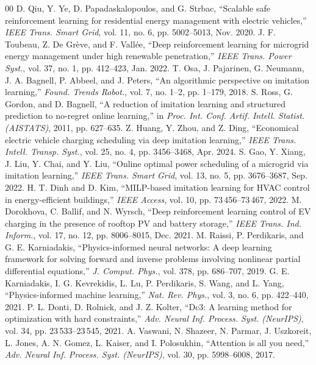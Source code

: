 \documentclass[journal]{IEEEtran}
\theoremstyle{remark}
\begin{document}
\begin{thebibliography}{00}
 D. Qiu, Y. Ye, D. Papadaskalopoulos, and G. Strbac, ``Scalable safe reinforcement learning for residential energy management with electric vehicles,'' \textit{IEEE Trans. Smart Grid}, vol. 11, no. 6, pp. 5002--5013, Nov. 2020.
 J. F. Toubeau, Z. De Gr\`{e}ve, and F. Vall\'{e}e, ``Deep reinforcement learning for microgrid energy management under high renewable penetration,'' \textit{IEEE Trans. Power Syst.}, vol. 37, no. 1, pp. 412--423, Jan. 2022.
 T. Osa, J. Pajarinen, G. Neumann, J. A. Bagnell, P. Abbeel, and J. Peters, ``An algorithmic perspective on imitation learning,'' \textit{Found. Trends Robot.}, vol. 7, no. 1--2, pp. 1--179, 2018.
 S. Ross, G. Gordon, and D. Bagnell, ``A reduction of imitation learning and structured prediction to no-regret online learning,'' in \textit{Proc. Int. Conf. Artif. Intell. Statist. (AISTATS)}, 2011, pp. 627--635.
 Z. Huang, Y. Zhou, and Z. Ding, ``Economical electric vehicle charging scheduling via deep imitation learning,'' \textit{IEEE Trans. Intell. Transp. Syst.}, vol. 25, no. 4, pp. 3456--3468, Apr. 2024.
 S. Gao, Y. Xiang, J. Liu, Y. Chai, and Y. Liu, ``Online optimal power scheduling of a microgrid via imitation learning,'' \textit{IEEE Trans. Smart Grid}, vol. 13, no. 5, pp. 3676--3687, Sep. 2022.
 H. T. Dinh and D. Kim, ``MILP-based imitation learning for HVAC control in energy-efficient buildings,'' \textit{IEEE Access}, vol. 10, pp. 73\,456--73\,467, 2022.
 M. Dorokhova, C. Ballif, and N. Wyrsch, ``Deep reinforcement learning control of EV charging in the presence of rooftop PV and battery storage,'' \textit{IEEE Trans. Ind. Inform.}, vol. 17, no. 12, pp. 8006--8015, Dec. 2021.
 M. Raissi, P. Perdikaris, and G. E. Karniadakis, ``Physics-informed neural networks: A deep learning framework for solving forward and inverse problems involving nonlinear partial differential equations,'' \textit{J. Comput. Phys.}, vol. 378, pp. 686--707, 2019.
 G. E. Karniadakis, I. G. Kevrekidis, L. Lu, P. Perdikaris, S. Wang, and L. Yang, ``Physics-informed machine learning,'' \textit{Nat. Rev. Phys.}, vol. 3, no. 6, pp. 422--440, 2021.
 P. L. Donti, D. Rolnick, and J. Z. Kolter, ``Dc3: A learning method for optimization with hard constraints,'' \textit{Adv. Neural Inf. Process. Syst. (NeurIPS)}, vol. 34, pp. 23\,533--23\,545, 2021.
 A. Vaswani, N. Shazeer, N. Parmar, J. Uszkoreit, L. Jones, A. N. Gomez, L. Kaiser, and I. Polosukhin, ``Attention is all you need,'' \textit{Adv. Neural Inf. Process. Syst. (NeurIPS)}, vol. 30, pp. 5998--6008, 2017.

\end{thebibliography}
\end{document}
